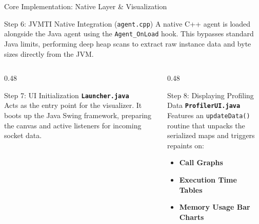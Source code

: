 \documentclass[aspectratio=169]{beamer}
\begin{document}
\begin{frame}{Core Implementation: Native Layer \& Visualization}
    \begin{alertblock}{Step 6: JVMTI Native Integration (\texttt{agent.cpp})}
        \small
        A native C++ agent is loaded alongside the Java agent using the \texttt{Agent\_OnLoad} hook. This bypasses standard Java limits, performing deep heap scans to extract raw instance data and byte sizes directly from the JVM.
    \end{alertblock}

    \begin{columns}[T]
        \begin{column}{0.48\textwidth}
            \begin{block}{Step 7: UI Initialization}
                \small \textbf{\texttt{Launcher.java}}\\
                Acts as the entry point for the visualizer. It boots up the Java Swing framework, preparing the canvas and active listeners for incoming socket data.
            \end{block}
        \end{column}
        
        \begin{column}{0.48\textwidth}
            \begin{block}{Step 8: Displaying Profiling Data}
                \small \textbf{\texttt{ProfilerUI.java}}\\
                Features an \texttt{updateData()} routine that unpacks the serialized maps and triggers repaints on:
                \begin{itemize}
                    \item \textbf{Call Graphs}
                    \item \textbf{Execution Time Tables}
                    \item \textbf{Memory Usage Bar Charts}
                \end{itemize}
            \end{block}
        \end{column}
    \end{columns}
\end{frame}
\end{document}
